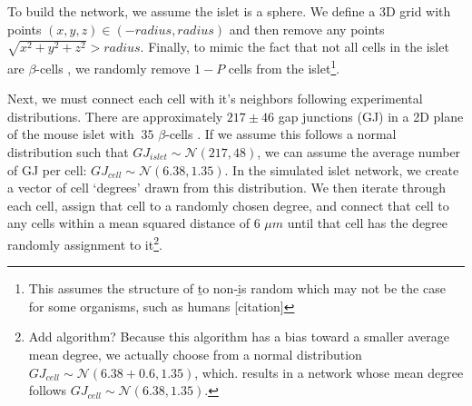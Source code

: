 \documentclass[10pt]{report}
\newcommand{\bs}{$\beta$-cells }
\begin{document}
To build the network, we assume the islet is a sphere. We define a 3D grid with points $(x,y,z) \in (-radius, radius)$ and then remove any points $\sqrt{x^2+y^2+z^2} > radius$.  Finally, to mimic the fact that not all cells in the islet are \bs, we randomly remove $1-P$ cells from the islet\footnote{This assumes the structure of \b to non-\b is random which may not be the case for some organisms, such as humans [citation]}. 

Next, we must connect each cell with it's neighbors following experimental distributions. There are approximately $217 \pm 46$ gap junctions (GJ) in a 2D plane of the mouse islet with $~35$ \bs. If we assume this follows a normal distribution such that $GJ_{islet} \sim \mathcal{N}(217, 48)$, we can assume the average number of GJ per cell: $GJ_{cell} \sim \mathcal{N}(6.38, 1.35)$. In the simulated islet network, we create a vector of cell `degrees' drawn from this distribution. We then iterate through each cell, assign that cell to a randomly chosen degree, and connect that cell to any cells within a mean squared distance of 6 $\mu m$ until that cell has the degree randomly assignment to it\footnote{Add algorithm? Because this algorithm has a bias toward a smaller average mean degree, we actually choose from a normal distribution $GJ_{cell} \sim \mathcal{N}(6.38+0.6, 1.35)$, which. results in a network whose mean degree follows $GJ_{cell} \sim \mathcal{N}(6.38, 1.35)$.}. 
\end{document}
